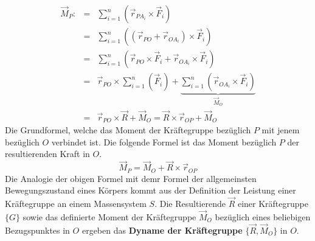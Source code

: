 \begin{equation}
\boxed{\begin{array}{lll}
\overrightarrow{M}_P:&=&\displaystyle \sum_{i=1}^n\left(\overrightarrow{r}_{PA_i}\times \overrightarrow{F}_i\right)\\
&=&\displaystyle \sum_{i=1}^n\left(\left(\overrightarrow{r}_{PO}+\overrightarrow{r}_{OA_i}\right)\times \overrightarrow{F}_i\right)\\
&=&\displaystyle \sum_{i=1}^n\left(\overrightarrow{r}_{PO}\times \overrightarrow{F}_i+\overrightarrow{r}_{OA_i}\times \overrightarrow{F}_i\right)\\
&=&\overrightarrow{r}_{PO}\times \displaystyle \sum_{i=1}^n\left(\overrightarrow{F}_i\right)+\underbrace{\displaystyle \sum_{i=1}^n\left(\overrightarrow{r}_{OA_i}\times \overrightarrow{F}_i\right)}_{\overrightarrow{M}_O}\\
&=&\overrightarrow{r}_{PO}\times \overrightarrow{R}+\overrightarrow{M}_O=\overrightarrow{R}\times \overrightarrow{r}_{OP}+\overrightarrow{M}_O
\end{array}}
\end{equation}
Die Grundformel, welche das Moment der Kräftegruppe bezüglich $P$ mit jenem bezüglich $O$ verbindet ist. Die folgende Formel ist das Moment bezüglich $P$ der resultierenden Kraft in $O$.
\begin{equation}
\boxed{\overrightarrow{M}_P=\overrightarrow{M}_O+\overrightarrow{R}\times \overrightarrow{r}_{OP}}
\end{equation}
Die Analogie der obigen Formel mit demr Formel der allgemeinsten Bewegungszustand eines Körpers kommt aus der Definition der Leistung einer Kräftegruppe an einem Massensystem $S$.
\newline\newline
Die Resultierende $\overrightarrow{R}$ einer Kräftegruppe $\{G\}$ sowie das definierte Moment der Kräftegruppe $\overrightarrow{M}_O$  bezüglich eines beliebigen Bezugspunktes in $O$ ergeben das \textbf{Dyname der Kräftegruppe} $\{\overrightarrow{R}, \overrightarrow{M}_O\}$ in $O$.

